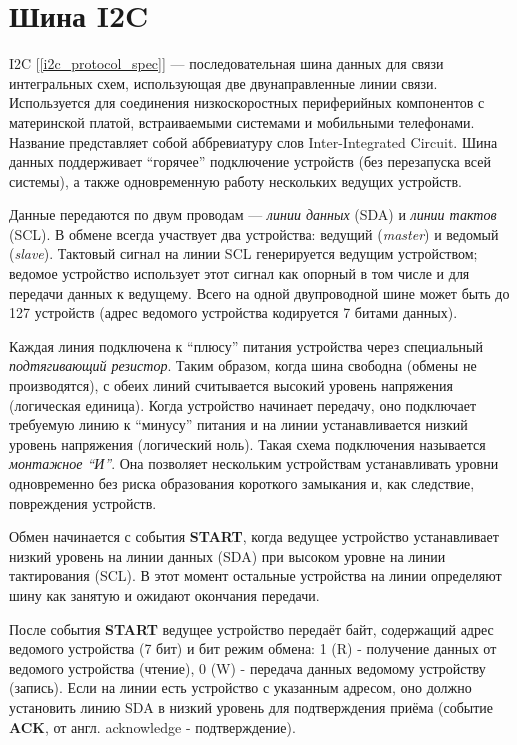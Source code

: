 \section{Шина I2C} 

\label{i2c_bus}

I2C [\ref{i2c_protocol_spec}] — последовательная шина данных для связи интегральных схем, использующая две двунаправленные линии связи. Используется для соединения низкоскоростных периферийных компонентов с материнской платой, встраиваемыми системами и мобильными телефонами. Название представляет собой аббревиатуру слов Inter-Integrated Circuit. Шина данных поддерживает ``горячее'' подключение устройств (без перезапуска всей системы), а также одновременную работу нескольких ведущих устройств.

Данные передаются по двум проводам — \textit{линии данных} (SDA) и \textit{линии тактов} (SCL). В обмене всегда участвует два устройства: ведущий (\textit{master}) и ведомый (\textit{slave}). Тактовый сигнал на линии SCL генерируется ведущим устройством; ведомое устройство использует этот сигнал как опорный в том числе и для передачи данных к ведущему. Всего на одной двупроводной шине может быть до 127 устройств (адрес ведомого устройства кодируется 7 битами данных).

Каждая линия подключена к ``плюсу'' питания устройства через специальный \textit{подтягивающий резистор}. Таким образом, когда шина свободна  (обмены не производятся), с обеих линий считывается высокий уровень напряжения (логическая единица). Когда устройство начинает передачу, оно подключает требуемую линию к ``минусу'' питания и на линии устанавливается низкий уровень напряжения (логический ноль). Такая схема подключения называется \textit{монтажное ``И''}. Она позволяет нескольким устройствам устанавливать уровни одновременно без риска образования короткого замыкания и, как следствие, повреждения устройств.

Обмен начинается с события \textbf{START}, когда ведущее устройство устанавливает низкий уровень на линии данных (SDA) при высоком уровне на линии тактирования (SCL). В этот момент остальные устройства на линии определяют шину как занятую и ожидают окончания передачи.

После события \textbf{START} ведущее устройство передаёт байт, содержащий адрес ведомого устройства (7 бит) и бит режим обмена: 1 (R) - получение данных от ведомого устройства (чтение), 0 (W) - передача данных ведомому устройству (запись). Если на линии есть устройство с указанным адресом, оно должно установить линию SDA в низкий уровень для подтверждения приёма (событие \textbf{ACK}, от англ. acknowledge - подтверждение).

